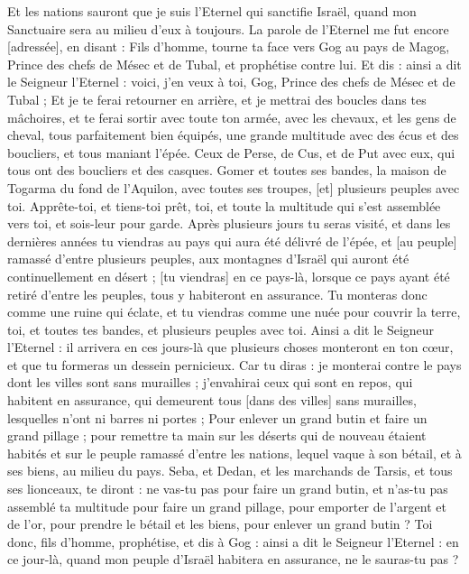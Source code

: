 \begin{multicols}{2}
Et les nations sauront que je suis l'Eternel qui sanctifie Israël, quand mon Sanctuaire sera au milieu d'eux à toujours.
\VerseOne{}La parole de l'Eternel me fut encore [adressée], en disant :
Fils d'homme, tourne ta face vers Gog au pays de Magog, Prince des chefs de Mésec et de Tubal, et prophétise contre lui.
Et dis : ainsi a dit le Seigneur l'Eternel : voici, j'en veux à toi, Gog, Prince des chefs de Mésec et de Tubal ;
Et je te ferai retourner en arrière, et je mettrai des boucles dans tes mâchoires, et te ferai sortir avec toute ton armée, avec les chevaux, et les gens de cheval, tous parfaitement bien équipés, une grande multitude avec des écus et des boucliers, et tous maniant l'épée.
Ceux de Perse, de Cus, et de Put avec eux, qui tous ont des boucliers et des casques.
Gomer et toutes ses bandes, la maison de Togarma du fond de l'Aquilon, avec toutes ses troupes, [et] plusieurs peuples avec toi.
Apprête-toi, et tiens-toi prêt, toi, et toute la multitude qui s'est assemblée vers toi, et sois-leur pour garde.
Après plusieurs jours tu seras visité, et dans les dernières années tu viendras au pays qui aura été délivré de l'épée, et [au peuple] ramassé d'entre plusieurs peuples, aux montagnes d'Israël qui auront été continuellement en désert ; [tu viendras] en ce pays-là, lorsque ce pays ayant été retiré d'entre les peuples, tous y habiteront en assurance.
Tu monteras donc comme une ruine qui éclate, et tu viendras comme une nuée pour couvrir la terre, toi, et toutes tes bandes, et plusieurs peuples avec toi.
Ainsi a dit le Seigneur l'Eternel : il arrivera en ces jours-là que plusieurs choses monteront en ton cœur, et que tu formeras un dessein pernicieux.
Car tu diras : je monterai contre le pays dont les villes sont sans murailles ; j'envahirai ceux qui sont en repos, qui habitent en assurance, qui demeurent tous [dans des villes] sans murailles, lesquelles n'ont ni barres ni portes ;
Pour enlever un grand butin et faire un grand pillage ; pour remettre ta main sur les déserts qui de nouveau étaient habités et sur le peuple ramassé d'entre les nations, lequel vaque à son bétail, et à ses biens, au milieu du pays.
Seba, et Dedan, et les marchands de Tarsis, et tous ses lionceaux, te diront : ne vas-tu pas pour faire un grand butin, et n'as-tu pas assemblé ta multitude pour faire un grand pillage, pour emporter de l'argent et de l'or, pour prendre le bétail et les biens, pour enlever un grand butin ?
Toi donc, fils d'homme, prophétise, et dis à Gog : ainsi a dit le Seigneur l'Eternel : en ce jour-là, quand mon peuple d'Israël habitera en assurance, ne le sauras-tu pas ?

\end{multicols}
